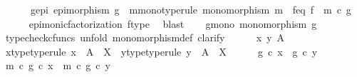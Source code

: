\begin{isabellebody}
\ \ \ \ \ \ g{\isacharunderscore}{\kern0pt}epi{\isacharcolon}{\kern0pt}\ {\isachardoublequoteopen}epimorphism\ g{\isachardoublequoteclose}\ \ m{\isacharunderscore}{\kern0pt}mono{\isacharbrackleft}{\kern0pt}type{\isacharunderscore}{\kern0pt}rule{\isacharbrackright}{\kern0pt}{\isacharcolon}{\kern0pt}\ {\isachardoublequoteopen}monomorphism\ m{\isachardoublequoteclose}\ \ f{\isacharunderscore}{\kern0pt}eq{\isacharcolon}{\kern0pt}\ {\isachardoublequoteopen}f\ {\isacharequal}{\kern0pt}\ m\ {\isasymcirc}\isactrlsub c\ g{\isachardoublequoteclose}\isanewline
\ \ \ \ \isamarkupfalse%
\ epi{\isacharunderscore}{\kern0pt}monic{\isacharunderscore}{\kern0pt}factorization{}\ f{\isacharunderscore}{\kern0pt}type\ \isamarkupfalse%
\ blast\isanewline
\isanewline
\ \ \isamarkupfalse%
\ g{\isacharunderscore}{\kern0pt}mono{\isacharcolon}{\kern0pt}\ {\isachardoublequoteopen}monomorphism\ g{\isachardoublequoteclose}\isanewline
\ \ \isamarkupfalse%
\ {\isacharparenleft}{\kern0pt}typecheck{\isacharunderscore}{\kern0pt}cfuncs{\isacharcomma}{\kern0pt}\ unfold\ monomorphism{\isacharunderscore}{\kern0pt}def{}{\isacharcomma}{\kern0pt}\ clarify{\isacharparenright}{\kern0pt}\isanewline
\ \ \ \ \isamarkupfalse%
\ x\ y\ A\isanewline
\ \ \ \ \isamarkupfalse%
\ x{\isacharunderscore}{\kern0pt}type{\isacharbrackleft}{\kern0pt}type{\isacharunderscore}{\kern0pt}rule{\isacharbrackright}{\kern0pt}{\isacharcolon}{\kern0pt}\ {\isachardoublequoteopen}x\ {\isacharcolon}{\kern0pt}\ A\ {\isasymrightarrow}\ X{\isachardoublequoteclose}\ \ y{\isacharunderscore}{\kern0pt}type{\isacharbrackleft}{\kern0pt}type{\isacharunderscore}{\kern0pt}rule{\isacharbrackright}{\kern0pt}{\isacharcolon}{\kern0pt}\ {\isachardoublequoteopen}y\ {\isacharcolon}{\kern0pt}\ A\ {\isasymrightarrow}\ X{\isachardoublequoteclose}\isanewline
\ \ \ \ \isamarkupfalse%
\ {\isachardoublequoteopen}g\ {\isasymcirc}\isactrlsub c\ x\ {\isacharequal}{\kern0pt}\ g\ {\isasymcirc}\isactrlsub c\ y{\isachardoublequoteclose}\isanewline
\ \ \ \ \isamarkupfalse%
\ \isamarkupfalse%
\ {\isachardoublequoteopen}{\isacharparenleft}{\kern0pt}m\ {\isasymcirc}\isactrlsub c\ g{\isacharparenright}{\kern0pt}\ {\isasymcirc}\isactrlsub c\ x\ {\isacharequal}{\kern0pt}\ {\isacharparenleft}{\kern0pt}m\ {\isasymcirc}\isactrlsub c\ g{\isacharparenright}{\kern0pt}\ {\isasymcirc}\isactrlsub c\ y{\isachardoublequoteclose}\isanewline
\ \ \ \ \ \ \isamarkupfalse%

\end{isabellebody}
